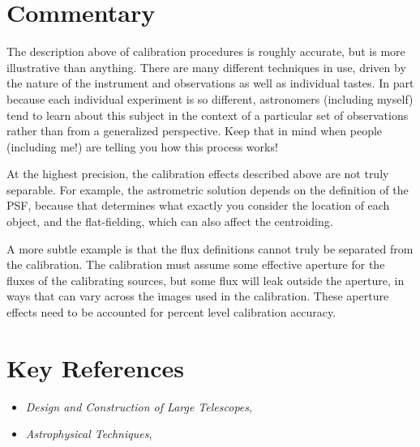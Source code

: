 \section{Commentary}

The description above of calibration procedures is roughly accurate,
but is more illustrative than anything. There are many different
techniques in use, driven by the nature of the instrument and
observations as well as individual tastes. In part because each
individual experiment is so different, astronomers (including myself)
tend to learn about this subject in the context of a particular set of
observations rather than from a generalized perspective. Keep that in
mind when people (including me!) are telling you how this process
works!

At the highest precision, the calibration effects described above are
not truly separable. For example, the astrometric solution depends on
the definition of the PSF, because that determines what exactly you
consider the location of each object, and the flat-fielding, which can
also affect the centroiding.

A more subtle example is that the flux definitions cannot truly be
separated from the calibration. The calibration must assume some
effective aperture for the fluxes of the calibrating sources, but some
flux will leak outside the aperture, in ways that can vary across the
images used in the calibration. These aperture effects need to be
accounted for percent level calibration accuracy.

\section{Key References}

\begin{itemize}
  \item
    {\it Design and Construction of Large Telescopes},
      \citet{bely03a}
  \item
    {\it Astrophysical Techniques}, \citet{kitchin09a}
\end{itemize}


